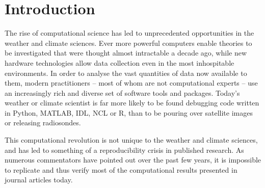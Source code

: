 \section{Introduction}
The rise of computational science has led to unprecedented opportunities in the weather and climate sciences. Ever more powerful computers enable theories to be investigated that were thought almost intractable a decade ago, while new hardware technologies allow data collection even in the most inhospitable environments. In order to analyse the vast quantities of data now available to them, modern practitioners – most of whom are not computational experts – use an increasingly rich and diverse set of software tools and packages. Today's weather or climate scientist is far more likely to be found debugging code written in Python, MATLAB, IDL, NCL or R, than to be pouring over satellite images or releasing radiosondes. 

This computational revolution is not unique to the weather and climate sciences, and has led to something of a reproducibility crisis in published research. As numerous commentators have pointed out over the past few years, it is impossible to replicate and thus verify most of the computational results presented in journal articles today.

